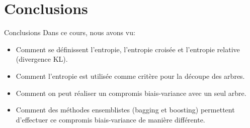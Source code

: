 \section{Conclusions}

\begin{frame}{Conclusions}
	Dans ce cours, nous avons vu:
	\begin{itemize}
		\item Comment se définissent l'entropie, l'entropie croisée et l'entropie relative (divergence KL).
		\item Comment l'entropie est utilisée comme critère pour la découpe des arbres.
		\item Comment on peut réaliser un compromis biais-variance avec un seul arbre.
		\item Comment des méthodes ensemblistes (bagging et boosting) permettent d'effectuer ce compromis biais-variance de manière différente.
	\end{itemize}
\end{frame}